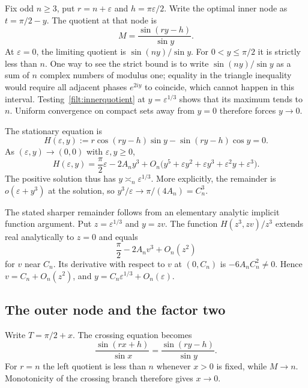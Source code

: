 Fix odd $n\ge3$, put $r=n+\varepsilon$ and
$h=\pi\varepsilon/2$.  Write the optimal inner node as
$t=\pi/2-y$.  The quotient at that node is
\begin{equation}\label{filt:innerquotient}
 M=\frac{\sin(ry-h)}{\sin y}.
\end{equation}
At $\varepsilon=0$, the limiting quotient is $\sin(ny)/\sin y$.
For $0<y\le\pi/2$ it is strictly less than $n$.  One way to see the strict
bound is to write $\sin(ny)/\sin y$ as a sum of $n$ complex numbers of
modulus one; equality in the triangle inequality would require all adjacent
phases $e^{2iy}$ to coincide, which cannot happen in this interval.
Testing~\eqref{filt:innerquotient} at $y=\varepsilon^{1/3}$ shows that its
maximum tends to $n$.  Uniform convergence on compact sets away from $y=0$
therefore forces $y\to0$.

The stationary equation is
\begin{equation}\label{filt:stationarynear}
 H(\varepsilon,y):=
 r\cos(ry-h)\sin y-\sin(ry-h)\cos y=0.
\end{equation}
As $(\varepsilon,y)\to(0,0)$ with $\varepsilon,y\ge0$,
\[
 H(\varepsilon,y)
 =\frac\pi2\varepsilon-2A_ny^3
 +O_n\bigl(y^5+\varepsilon y^2+\varepsilon y^3
                 +\varepsilon^2y+\varepsilon^3\bigr).
\]
The positive solution thus has $y\asymp_n\varepsilon^{1/3}$.  More explicitly,
the remainder is $o(\varepsilon+y^3)$ at the solution, so
$y^3/\varepsilon\to\pi/(4A_n)=C_n^3$.

The stated sharper remainder follows from an elementary analytic implicit
function argument.  Put $z=\varepsilon^{1/3}$ and $y=zv$.  The function
$H(z^3,zv)/z^3$ extends real analytically to $z=0$ and equals
\[
 \frac\pi2-2A_nv^3+O_n(z^2)
\]
for $v$ near $C_n$.  Its derivative with respect to $v$ at $(0,C_n)$ is
$-6A_nC_n^2\ne0$.  Hence $v=C_n+O_n(z^2)$, and
$y=C_n\varepsilon^{1/3}+O_n(\varepsilon)$.

\subsection{The outer node and the factor two}

Write $T=\pi/2+x$.  The crossing equation becomes
\begin{equation}\label{filt:nearcompare}
 \frac{\sin(rx+h)}{\sin x}
 =\frac{\sin(ry-h)}{\sin y}.
\end{equation}
For $r=n$ the left quotient is less than $n$ whenever $x>0$ is fixed,
while $M\to n$.  Monotonicity of the crossing branch therefore gives
$x\to0$.

